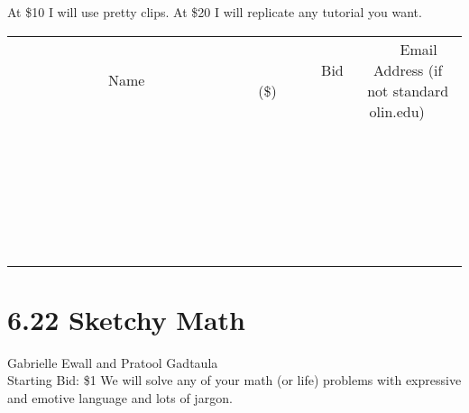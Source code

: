 \documentclass[11pt]{article}
\begin{document}
At \$10 I will use pretty clips. 
At \$20 I will replicate any tutorial you want.
\\[6ex]
\begin{tabular}{c c c}
~~~~~~~~~~~~~Name~~~~~~~~~~~~~ & ~~~~~~~~~Bid (\$)~~~~~~~~~  & ~~~Email Address (if not standard olin.edu)~~~\\
 & & \\
\hline
 & & \\
\hline
 & & \\
\hline
 & & \\
\hline
 & & \\
\hline
 & & \\
\hline
 & & \\
\hline
 & & \\
\hline
 & & \\
\hline
 & & \\
\hline
 & & \\
\hline
 & & \\
\hline
 & & \\
\hline
 & & \\
\hline
 & & \\
\hline
 & & \\
\hline
 & & \\
\hline
 & & \\
\hline
 & & \\
\hline
 & & \\
\hline
 & & \\
\hline
 & & \\
\hline
 & & \\
\hline
 & & \\
\hline
 & & \\
\hline
 & & \\
\hline
\end{tabular}
\newpage
\section*{6.22 Sketchy Math}
Gabrielle Ewall and Pratool Gadtaula
\\
Starting Bid: \$1
\newline
We will solve any of your math (or life) problems with expressive and emotive language and lots of jargon.
\end{document}
